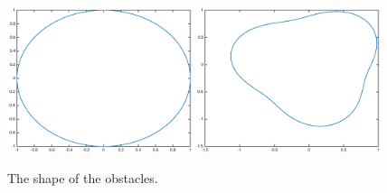 \documentclass[12pt]{iopart}
\begin{document}
\begin{figure}
	\centering
	\includegraphics[width=0.48\textwidth]{./figure_sc_elastic/circle.eps}
	\includegraphics[width=0.48\textwidth]{./figure_sc_elastic/pear.eps}
	\caption{The shape of the obstacles.}\label{shape}
\end{figure}
\end{document}
